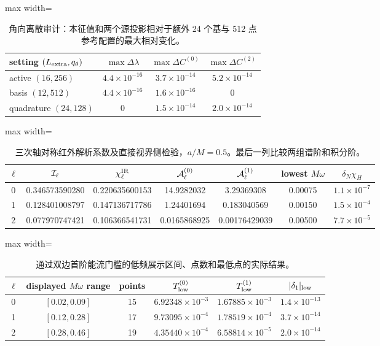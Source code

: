 \begin{table}[htbp]
\centering
\caption{角向离散审计：本征值和两个源投影相对于额外 24 个基与 512 点参考配置的最大相对变化。}
\label{note-tab:angular-convergence}
\begin{adjustbox}{max width=\textwidth}
\begin{tabular}{lccc}
setting $(L_{\rm extra},q_\theta)$ & $\max\Delta\lambda$
& $\max\Delta C^{(0)}$ & $\max\Delta C^{(2)}$\\
\midrule
active $(16,256)$ & $4.4\times10^{-16}$ & $3.7\times10^{-14}$ & $5.2\times10^{-14}$\\
basis $(12,512)$ & $4.4\times10^{-16}$ & $1.6\times10^{-16}$ & $0$\\
quadrature $(24,128)$ & $0$ & $1.5\times10^{-14}$ & $2.0\times10^{-14}$\\
\end{tabular}
\end{adjustbox}
\end{table}

\begin{table}[htbp]
\centering
\caption{三次轴对称红外解析系数及直接视界侧检验，$a/M=0.5$。最后一列比较两组谱阶和积分阶。}
\label{note-tab:axisymmetric-infrared}
\begin{adjustbox}{max width=\textwidth}
\begin{tabular}{c c c c c c c}
$\ell$ & ${\cal I}_\ell$ & $\chi^{\rm IR}_\ell$
& ${\cal A}^{(0)}_\ell$ & ${\cal A}^{(1)}_\ell$
& lowest $M\omega$ & $\delta_N\chi_H$\\
\hline
0 & 0.346573590280 & 0.220635600153 & 14.9282032 & 3.29369308 & 0.00075 & $1.1\times10^{-7}$\\
1 & 0.128401008797 & 0.147136717786 & 1.24401694 & 0.183040569 & 0.00150 & $1.5\times10^{-4}$\\
2 & 0.077970747421 & 0.106366541731 & 0.0165868925 & 0.00176429039 & 0.00500 & $7.7\times10^{-5}$\\
\end{tabular}
\end{adjustbox}
\end{table}

\begin{table}[htbp]
\centering
\caption{通过双边首阶能流门槛的低频展示区间、点数和最低点的实际结果。}
\label{note-tab:low-acceptance}
\begin{adjustbox}{max width=\textwidth}
\begin{tabular}{c c c c c c}
$\ell$ & displayed $M\omega$ range & points
& $T^{(0)}_{\rm low}$ & $T^{(1)}_{\rm low}$ & $|\delta_1|_{\rm low}$\\
\hline
0 & $[0.02,0.09]$ & 15 & $6.92348\times10^{-3}$ & $1.67885\times10^{-3}$ & $1.4\times10^{-13}$\\
1 & $[0.12,0.28]$ & 17 & $9.73095\times10^{-4}$ & $1.78519\times10^{-4}$ & $3.7\times10^{-14}$\\
2 & $[0.28,0.46]$ & 19 & $4.35440\times10^{-4}$ & $6.58814\times10^{-5}$ & $2.0\times10^{-14}$\\
\end{tabular}
\end{adjustbox}
\end{table}

